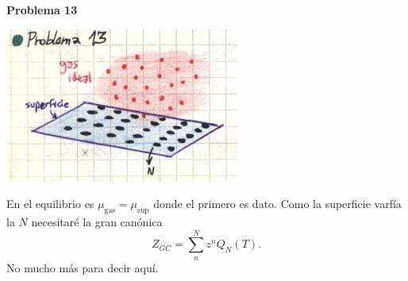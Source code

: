 \documentclass[10pt,oneside]{CBFT_book}
\begin{document}
\begin{ejemplo}{\bf Problema 13}

\includegraphics[scale=0.5]{images/1606329501.jpg}

En el equilibrio es $ \mu_\text{gas} = \mu_\text{sup} $ donde el primero es dato.
Como la superficie varfía la $N$ necesitaré la gran canónica
\[
	Z_{GC} = \sum_n^N z^n Q_N(T).
\]
No mucho más para decir aquí.
 
\end{ejemplo}
\end{document}
